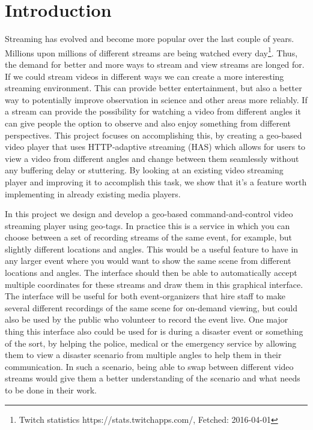 \chapter{Introduction}
\label{cha:introduction}

Streaming has evolved and become more popular over the last couple of years. Millions upon millions of different streams are being watched every day\footnote{Twitch statistics https://stats.twitchapps.com/, Fetched: 2016-04-01}. Thus, the demand for better and more ways to stream and view streams are longed for. If we could stream videos in different ways we can create a more interesting streaming environment. This can provide better entertainment, but also a better way to potentially improve observation in science and other areas more reliably. If a stream can provide the possibility for watching a video from different angles it can give people the option to observe and also enjoy something from different perspectives. This project focuses on accomplishing this, by creating a geo-based video player that uses HTTP-adaptive streaming (HAS) which allows for users to view a video from different angles and change between them seamlessly without any buffering delay or stuttering. By looking at an existing video streaming player and improving it to accomplish this task, we show that it's a feature worth implementing in already existing media players.

In this project we design and develop a geo-based command-and-control video streaming player using geo-tags. In practice this is a service in which you can choose between a set of recording streams of the same event, for example, but slightly different locations and angles. This would be a useful feature to have in any larger event where you would want to show the same scene from different locations and angles. The interface should then be able to automatically accept multiple coordinates for these streams and draw them in this graphical interface. The interface will be useful for both event-organizers that hire staff to make several different recordings of the same scene for on-demand viewing, but could also be used by the public who volunteer to record the event live. One major thing this interface also could be used for is during a disaster event or something of the sort, by helping the police, medical or the emergency service by allowing them to view a disaster scenario from multiple angles to help them in their communication. In such a scenario, being able to swap between different video streams would give them a better understanding of the scenario and what needs to be done in their work.

